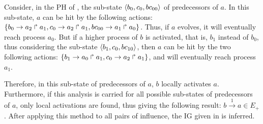 \begin{example*}
Consider, in the PH of , the sub-state $\langle b_0, c_0, bc_{00} \rangle$ of predecessors of $a$.
In this sub-state, $a$ can be hit by the following actions: $\{b_0\rightarrow a_2\Rsh a_1, c_0\rightarrow a_2\Rsh a_1, bc_{00}\rightarrow a_1\Rsh a_0\}$.
Thus, if $a$ evolves, it will eventually reach process $a_0$.
But if a higher process of $b$ is activated, that is, $b_1$ instead of $b_0$, thus considering the sub-state $\langle b_1, c_0, bc_{10} \rangle$,
then $a$ can be hit by the two following actions: $\{b_1\rightarrow a_0\Rsh a_1, c_0\rightarrow a_2\Rsh a_1\}$,
and will eventually reach process $a_1$.

Therefore, in this sub-state of predecessors of $a$, $b$ locally activates $a$.
Furthermore, if this analysis is carried for all possible sub-states of predecessors of $a$, only local activations are found,
thus giving the following result: $b \xrightarrow{1} a \in E_+$.
After applying this method to all pairs of influence, the IG given in  is inferred.
\end{example*}
